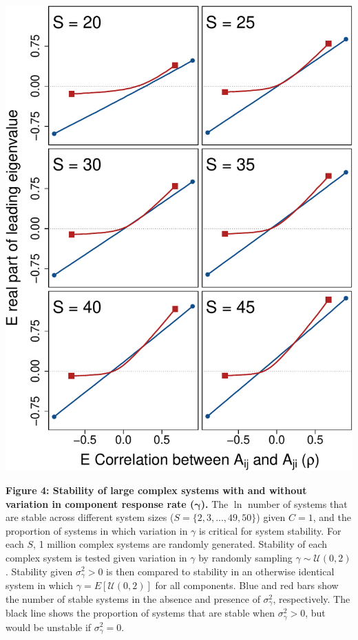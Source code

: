 \documentclass[]{article}
\begin{document}
\includegraphics{ms_files/figure-latex/unnamed-chunk-13-1.pdf}

\clearpage

\textbf{Figure 4: Stability of large complex systems with and without
variation in component response rate (\(\boldsymbol{\gamma}\)).} The
\(\ln\) number of systems that are stable across different system sizes
(\(S = \{2, 3, ..., 49, 50 \}\)) given \(C = 1\), and the proportion of
systems in which variation in \(\gamma\) is critical for system
stability. For each \(S\), 1 million complex systems are randomly
generated. Stability of each complex system is tested given variation in
\(\gamma\) by randomly sampling \(\gamma \sim \mathcal{U}(0, 2)\).
Stability given \(\sigma^{2}_{\gamma}>0\) is then compared to stability
in an otherwise identical system in which
\(\gamma = E[\mathcal{U}(0, 2)]\) for all components. Blue and red bars
show the number of stable systems in the absence and presence of
\(\sigma^{2}_{\gamma}\), respectively. The black line shows the
proportion of systems that are stable when \(\sigma^{2}_{\gamma}>0\),
but would be unstable if \(\sigma^{2}_{\gamma}=0\).
\end{document}
